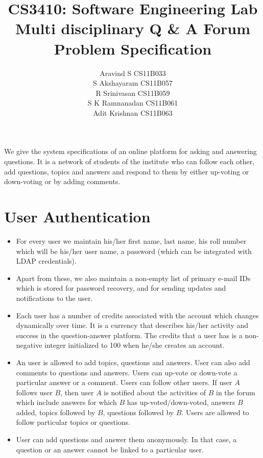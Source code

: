 \documentclass{article}
\begin{document}
\title{\textbf{CS3410: Software Engineering Lab}
\\
\textbf{Multi disciplinary Q \& A Forum\\Problem Specification}}
\author{ Aravind S CS11B033 \\
		 S Akshayaram CS11B057\\
		 R Srinivasan CS11B059\\
		 S K Ramnanadan CS11B061\\
		 Adit Krishnan  CS11B063\\
[0.2in]
}

\maketitle

We give the system specifications of an online platform for asking and answering questions. It is a network of students of the institute who can follow each other, add questions, topics and answers and respond to them by either up-voting or down-voting or by adding comments.

\section{User Authentication}
\begin{itemize}
\item For every user we maintain his/her first name, last name, his roll number which will be his/her user name, a password (which can be integrated with LDAP credentials).
\item Apart from these, we also maintain a non-empty list of primary e-mail IDs which is stored for password recovery, and for sending updates and notifications to the user.
\item Each user has a number of credits associated with the account which changes dynamically over time. It is a currency that describes his/her activity and success in the question-answer platform. The credits that a user has is a non-negative integer initialized to 100 when he/she creates an account.
\item An user is allowed to add topics, questions and answers. User can also add comments to questions and answers. Users can up-vote or down-vote a particular answer or a comment. Users can follow other users. If user $A$ follows user $B$, then user $A$ is notified about the activities of $B$ in the forum which include answers for which $B$ has up-voted/down-voted, answers $B$ added, topics followed by $B$, questions followed by $B$. Users are allowed to follow particular topics or questions.
\item User can add questions and answer them anonymously. In that case, a question or an answer cannot be linked to a particular user.
\end{itemize}
\end{document}
